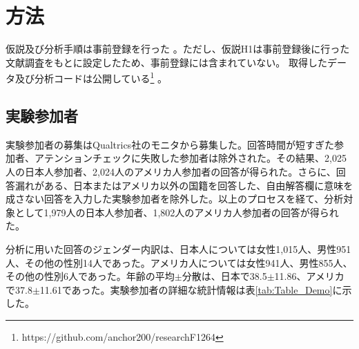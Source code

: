 \documentclass[a4j,12pt]{jreport}
\begin{document}
\section{方法}

仮説及び分析手順は事前登録を行った\cite{preregi} 。ただし、仮説H1は事前登録後に行った文献調査をもとに設定したため、事前登録には含まれていない。
取得したデータ及び分析コードは公開している\footnote{https://github.com/anchor200/researchF1264} 。
\subsection{実験参加者}
実験参加者の募集はQualtrics社のモニタから募集した。回答時間が短すぎた参加者、アテンションチェックに失敗した参加者は除外された。その結果、2,025人の日本人参加者、2,024人のアメリカ人参加者の回答が得られた。さらに、回答漏れがある、日本またはアメリカ以外の国籍を回答した、自由解答欄に意味を成さない回答を入力した実験参加者を除外した。以上のプロセスを経て、分析対象として1,979人の日本人参加者、1,802人のアメリカ人参加者の回答が得られた。


分析に用いた回答のジェンダー内訳は、日本人については女性1,015人、男性951人、その他の性別14人であった。アメリカ人については女性941人、男性855人、その他の性別6人であった。年齢の平均$\pm$分散は、日本で38.5$\pm$11.86、アメリカで37.8$\pm$11.61であった。実験参加者の詳細な統計情報は表\ref{tab:Table_Demo}に示した。
\end{document}
